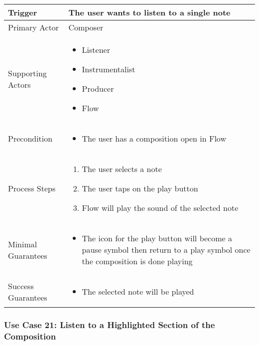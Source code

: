 \begin{tabularx}{\textwidth}{|X|X|}
\hline
Trigger & 
The user wants to listen to a single note \\
\hline
Primary Actor & 
Composer \\
\hline
Supporting Actors & 
\begin{itemize}
\item Listener
\item Instrumentalist
\item Producer
\item Flow
\end{itemize} \\
\hline
Precondition & 
\begin{itemize}
\item The user has a composition open in Flow
\end{itemize} \\
\hline
Process Steps & 
\begin{enumerate}
\item The user selects a note
\item The user taps on the play button
\item Flow will play the sound of the selected note
\end{enumerate} \\
\hline
Minimal Guarantees & 
\begin{itemize}
 \item The icon for the play button will become a pause symbol then return to a play symbol once the composition is done playing
\end{itemize} \\
\hline
Success Guarantees & 
\begin{itemize}
  \item The selected note will be played
\end{itemize} \\
\hline
\end{tabularx}

\subsubsection{Use Case 21: Listen to a Highlighted Section of the Composition}

